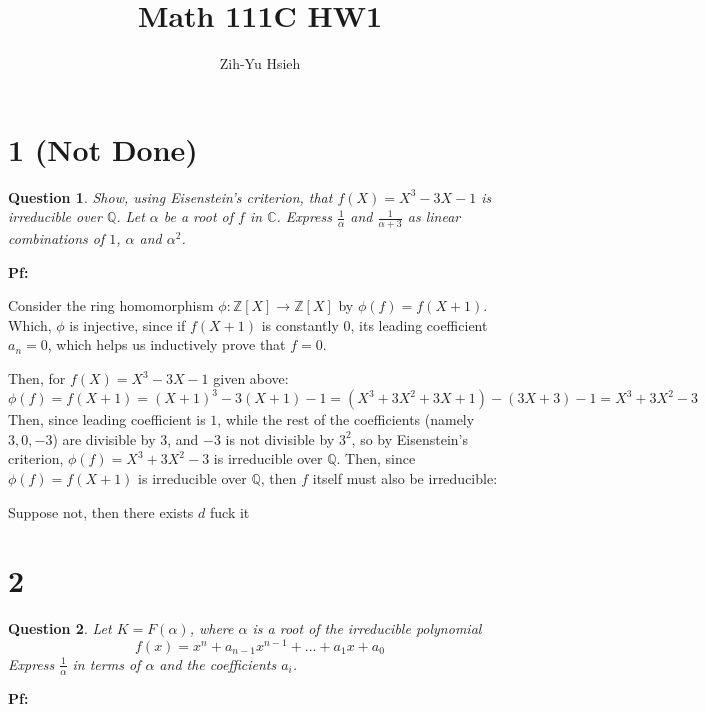 \documentclass{article}
\title{Math 111C HW1}
\author{Zih-Yu Hsieh}
\newtheorem{question}{Question}
\begin{document}
\maketitle

\section*{1 (Not Done)}
\begin{myBox}[]{}
    \begin{question}
        Show, using Eisenstein's criterion, that $f(X)=X^3-3X-1$ is irreducible over $\mathbb{Q}$. Let $\alpha$ be a root of $f$ in $\mathbb{C}$. 
        Express $\frac{1}{\alpha}$ and $\frac{1}{\alpha+3}$ as linear combinations of $1$, $\alpha$ and $\alpha^2$.
    \end{question}
\end{myBox}

\textbf{Pf:}

Consider the ring homomorphism $\phi:\mathbb{Z}[X]\rightarrow \mathbb{Z}[X]$ by $\phi(f)=f(X+1)$. Which, $\phi$ is injective, since if $f(X+1)$ is constantly $0$, 
its leading coefficient $a_n=0$, which helps us inductively prove that $f=0$.

Then, for $f(X)=X^3-3X-1$ given above:
$$\phi(f)=f(X+1)=(X+1)^3-3(X+1)-1 = (X^3+3X^2+3X+1)-(3X+3)-1 = X^3+3X^2-3$$
Then, since leading coefficient is $1$, while the rest of the coefficients (namely $3,0,-3$) are divisible by $3$, and $-3$ is not divisible by $3^2$,
so by Eisenstein's criterion, $\phi(f)=X^3+3X^2-3$ is irreducible over $\mathbb{Q}$. Then, since $\phi(f)=f(X+1)$ is irreducible over $\mathbb{Q}$, then $f$ itself must also be irreducible:

Suppose not, then there exists $d$ fuck it

\break

\section*{2}
\begin{myBox}[]{}
    \begin{question}
        Let $K=F(\alpha)$, where $\alpha$ is a root of the irreducible polynomial
        $$f(x)=x^n+a_{n-1}x^{n-1}+...+a_1x+a_0$$
        Express $\frac{1}{\alpha}$ in terms of $\alpha$ and the coefficients $a_i$.
    \end{question}
\end{myBox}

\textbf{Pf:}
\end{document}
